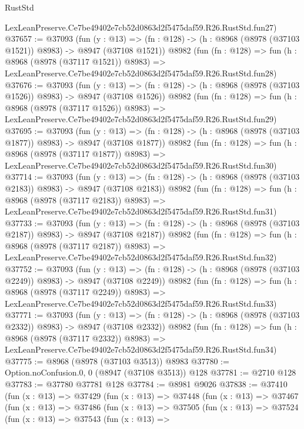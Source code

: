 \begin{lexlean}{RustStd}
\begin{coremodule}
    LexLeanPreserve.Ce7be49402e7cb52d0863d2f5475daf59.R26.RustStd.fun27)
@37657 := @37093
    (fun (y : @13) =>
    (fn : @128) -> (h : @8968 (@8978 (@37103 @1521)) @8983) -> @8947 (@37108 @1521))
    @8982
    (fun (fn : @128) =>
    fun (h : @8968 (@8978 (@37117 @1521)) @8983) =>
    LexLeanPreserve.Ce7be49402e7cb52d0863d2f5475daf59.R26.RustStd.fun28)
@37676 := @37093
    (fun (y : @13) =>
    (fn : @128) -> (h : @8968 (@8978 (@37103 @1526)) @8983) -> @8947 (@37108 @1526))
    @8982
    (fun (fn : @128) =>
    fun (h : @8968 (@8978 (@37117 @1526)) @8983) =>
    LexLeanPreserve.Ce7be49402e7cb52d0863d2f5475daf59.R26.RustStd.fun29)
@37695 := @37093
    (fun (y : @13) =>
    (fn : @128) -> (h : @8968 (@8978 (@37103 @1877)) @8983) -> @8947 (@37108 @1877))
    @8982
    (fun (fn : @128) =>
    fun (h : @8968 (@8978 (@37117 @1877)) @8983) =>
    LexLeanPreserve.Ce7be49402e7cb52d0863d2f5475daf59.R26.RustStd.fun30)
@37714 := @37093
    (fun (y : @13) =>
    (fn : @128) -> (h : @8968 (@8978 (@37103 @2183)) @8983) -> @8947 (@37108 @2183))
    @8982
    (fun (fn : @128) =>
    fun (h : @8968 (@8978 (@37117 @2183)) @8983) =>
    LexLeanPreserve.Ce7be49402e7cb52d0863d2f5475daf59.R26.RustStd.fun31)
@37733 := @37093
    (fun (y : @13) =>
    (fn : @128) -> (h : @8968 (@8978 (@37103 @2187)) @8983) -> @8947 (@37108 @2187))
    @8982
    (fun (fn : @128) =>
    fun (h : @8968 (@8978 (@37117 @2187)) @8983) =>
    LexLeanPreserve.Ce7be49402e7cb52d0863d2f5475daf59.R26.RustStd.fun32)
@37752 := @37093
    (fun (y : @13) =>
    (fn : @128) -> (h : @8968 (@8978 (@37103 @2249)) @8983) -> @8947 (@37108 @2249))
    @8982
    (fun (fn : @128) =>
    fun (h : @8968 (@8978 (@37117 @2249)) @8983) =>
    LexLeanPreserve.Ce7be49402e7cb52d0863d2f5475daf59.R26.RustStd.fun33)
@37771 := @37093
    (fun (y : @13) =>
    (fn : @128) -> (h : @8968 (@8978 (@37103 @2332)) @8983) -> @8947 (@37108 @2332))
    @8982
    (fun (fn : @128) =>
    fun (h : @8968 (@8978 (@37117 @2332)) @8983) =>
    LexLeanPreserve.Ce7be49402e7cb52d0863d2f5475daf59.R26.RustStd.fun34)
@37775 := @8968 (@8978 (@37103 @3513)) @8983
@37780 := Option.noConfusion.{0, 0} (@8947 (@37108 @3513)) @128
@37781 := @2710 @128
@37783 := @37780 @37781 @128
@37784 := @8981 @9026
@37838 := @37410
    (fun (x : @13) =>
    @37429
      (fun (x : @13) =>
      @37448
        (fun (x : @13) =>
        @37467
          (fun (x : @13) =>
          @37486
            (fun (x : @13) =>
            @37505
              (fun (x : @13) =>
              @37524
                (fun (x : @13) =>
                @37543
                  (fun (x : @13) =>

\end{coremodule}
\end{lexlean}
